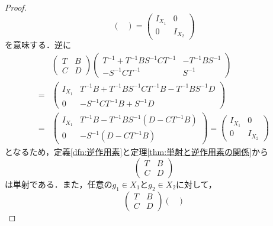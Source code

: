 \documentclass[11pt,a4paper,titlepage]{jsreport}
\theoremstyle{definition}
\begin{document}
\begin{proof}
\begin{equation*}
\begin{pmatrix}
    \end{pmatrix}
    =
    \begin{pmatrix}
      I_{X_1} & 0 \\
      0 & I_{X_2}
    \end{pmatrix}
  \end{equation*}
  を意味する．逆に
  \begin{equation*}
    \begin{split}
      &\begin{pmatrix}
        T & B \\
        C & D
      \end{pmatrix}
      \begin{pmatrix}
        T^{-1}+T^{-1}BS^{-1}CT^{-1} & -T^{-1}BS^{-1} \\
        -S^{-1}CT^{-1} & S^{-1}
      \end{pmatrix}
      \\=&
      \begin{pmatrix}
        I_{X_1} & T^{-1}B + T^{-1}BS^{-1}CT^{-1}B - T^{-1}BS^{-1}D \\
        0 & -S^{-1}CT^{-1}B+S^{-1}D
      \end{pmatrix}
      \\=&
      \begin{pmatrix}
        I_{X_1} & T^{-1}B - T^{-1}BS^{-1}(D-CT^{-1}B) \\
        0 & -S^{-1}(D-CT^{-1}B)
      \end{pmatrix}
      =
      \begin{pmatrix}
        I_{X_1} & 0 \\
        0 & I_{X_2}
      \end{pmatrix}
    \end{split}
  \end{equation*}
  となるため，定義\ref{dfn:逆作用素}と定理\ref{thm:単射と逆作用素の関係}から
  \begin{equation*}
    \begin{pmatrix}
      T & B \\
      C & D
    \end{pmatrix}
  \end{equation*}
  は単射である．また，任意の$g_1 \in X_1$と$g_2 \in X_2$に対して，
  \begin{equation*}
    \begin{pmatrix}
      T & B \\
      C & D
    \end{pmatrix}
    \begin{pmatrix}

\end{pmatrix}
\end{equation*}
\end{proof}
\end{document}
